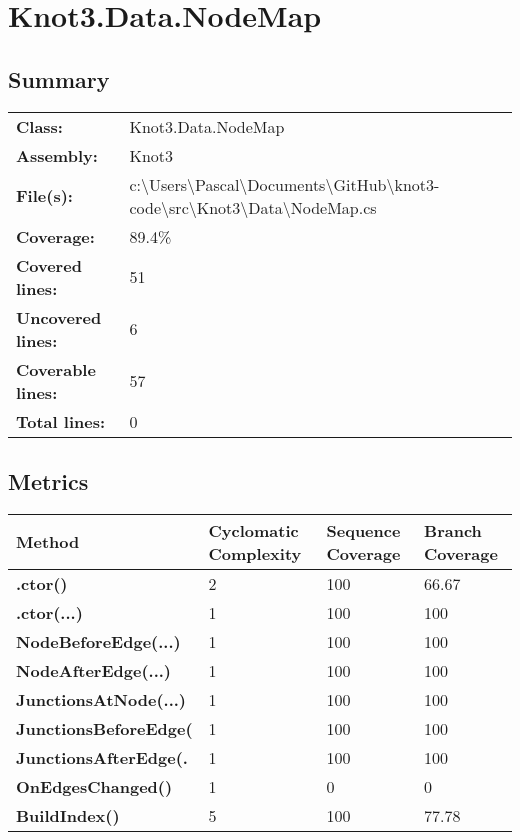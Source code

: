 \documentclass[a4paper,10pt]{article}
\begin{document}
\section{Knot3.Data.NodeMap}
\subsection{Summary}
\begin{longtable}[l]{ll}
\textbf{Class:} & Knot3.Data.NodeMap\\
\textbf{Assembly:} & Knot3\\
\textbf{File(s):} & \begin{minipage}[t]{12cm}{c:\textbackslash Users\textbackslash Pascal\textbackslash Documents\textbackslash GitHub\textbackslash knot3-code\textbackslash src\textbackslash Knot3\textbackslash Data\textbackslash NodeMap.cs}\end{minipage} \\
\textbf{Coverage:} & 89.4\%\\
\textbf{Covered lines:} & 51\\
\textbf{Uncovered lines:} & 6\\
\textbf{Coverable lines:} & 57\\
\textbf{Total lines:} & 0\\
\end{longtable}
\subsection{Metrics}
\begin{longtable}[l]{|l|l|l|l|}
\hline
\textbf{Method} & \textbf{Cyclomatic Complexity} & \textbf{Sequence Coverage} & \textbf{Branch Coverage}\\
\hline
\textbf{.ctor()} & 2 & 100 & 66.67\\
\hline
\textbf{.ctor(...)} & 1 & 100 & 100\\
\hline
\textbf{NodeBeforeEdge(...)} & 1 & 100 & 100\\
\hline
\textbf{NodeAfterEdge(...)} & 1 & 100 & 100\\
\hline
\textbf{JunctionsAtNode(...)} & 1 & 100 & 100\\
\hline
\textbf{JunctionsBeforeEdge(} & 1 & 100 & 100\\
\hline
\textbf{JunctionsAfterEdge(.} & 1 & 100 & 100\\
\hline
\textbf{OnEdgesChanged()} & 1 & 0 & 0\\
\hline
\textbf{BuildIndex()} & 5 & 100 & 77.78\\
\hline
\end{longtable}
\end{document}

